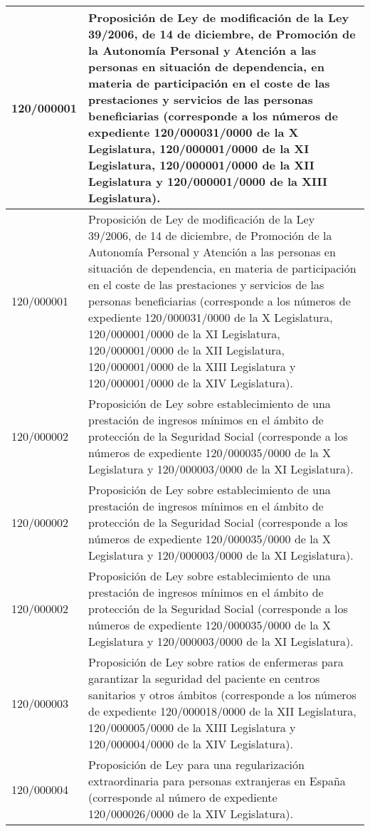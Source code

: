 {\begin{table}[H]
\begin{center}
\begin{tabularx}{\linewidth}{| l | X |}
120/000001 & Proposición de Ley de modificación de la Ley 39/2006, de 14 de diciembre, de Promoción de la Autonomía Personal y Atención a las personas en situación de dependencia, en materia de participación en el coste de las prestaciones y servicios de las personas beneficiarias (corresponde a los números de expediente 120/000031/0000 de la X Legislatura, 120/000001/0000 de la XI Legislatura, 120/000001/0000 de la XII Legislatura y 120/000001/0000 de la XIII Legislatura). \\
\hline
120/000001 & Proposición de Ley de modificación de la Ley 39/2006, de 14 de diciembre, de Promoción de la Autonomía Personal y Atención a las personas en situación de dependencia, en materia de participación en el coste de las prestaciones y servicios de las personas beneficiarias (corresponde a los números de expediente 120/000031/0000 de la X Legislatura, 120/000001/0000 de la XI Legislatura, 120/000001/0000 de la XII Legislatura, 120/000001/0000 de la XIII Legislatura y 120/000001/0000 de la XIV Legislatura). \\
\hline
120/000002 & Proposición de Ley sobre establecimiento de una prestación de ingresos mínimos en el ámbito de protección de la Seguridad Social (corresponde a los números de expediente 120/000035/0000 de la X Legislatura y 120/000003/0000 de la XI Legislatura). \\
\hline
120/000002 & Proposición de Ley sobre establecimiento de una prestación de ingresos mínimos en el ámbito de protección de la Seguridad Social (corresponde a los números de expediente 120/000035/0000 de la X Legislatura y 120/000003/0000 de la XI Legislatura). \\
\hline
120/000002 & Proposición de Ley sobre establecimiento de una prestación de ingresos mínimos en el ámbito de protección de la Seguridad Social (corresponde a los números de expediente 120/000035/0000 de la X Legislatura y 120/000003/0000 de la XI Legislatura). \\
\hline
120/000003 & Proposición de Ley sobre ratios de enfermeras para garantizar la seguridad del paciente en centros sanitarios y otros ámbitos (corresponde a los números de expediente 120/000018/0000 de la XII Legislatura, 120/000005/0000 de la XIII Legislatura y 120/000004/0000 de la XIV Legislatura). \\
\hline
120/000004 & Proposición de Ley para una regularización extraordinaria para personas extranjeras en España (corresponde al número de expediente 120/000026/0000 de la XIV Legislatura). \\

\end{tabularx}
\end{center}
\end{table}}
